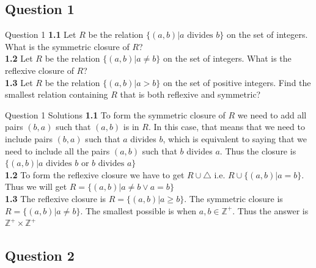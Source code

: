 \documentclass[xcolor=svgnames]{beamer}
\begin{document}
\subsection{Question 1}

\begin{frame}{Question 1}
    \textbf{1.1} Let $R$ be the relation $\{(a, b) | a \text{ divides } b\}$ on the set of integers. What is the symmetric closure of $R$? \\
    \textbf{1.2} Let $R$ be the relation $\{(a, b) | a \neq b \}$ on the set of integers. What is the reflexive closure of $R$? \\
    \textbf{1.3} Let $R$ be the relation $\{(a, b) | a > b \}$ on the set of positive integers. Find the smallest relation containing $R$ that is both reflexive and symmetric? \\
\end{frame}

\begin{frame}{Question 1 Solutions}
    \textbf{1.1} To form the symmetric closure of $R$ we need to add all pairs $(b, a)$ such that $(a, b)$ is in $R$. In this case, that means that we need to include pairs $(b, a)$ such that $a$ divides $b$, which is equivalent to saying that we need to include all the pairs $(a, b)$ such that $b$ divides $a$. Thus the closure is $\{ (a, b) | a \text{ divides } b \text{ or } b \text{ divides } a \}$ \\
    \textbf{1.2} To form the reflexive closure we have to get $R \cup \bigtriangleup$ i.e. $R \cup \{(a, b) | a = b\}$. Thus we will get $R = \{(a, b) | a \neq b \vee a = b\}$ \\
    \textbf{1.3} The reflexive closure is $R = \{(a, b) | a \geq b\}$. The symmetric closure is $R = \{(a, b) | a \neq b\}$. The smallest possible is when $a, b \in \mathbb{Z}^+$. Thus the answer is $\mathbb{Z}^+ \times \mathbb{Z}^+$
\end{frame}


\subsection{Question 2}
\end{document}
